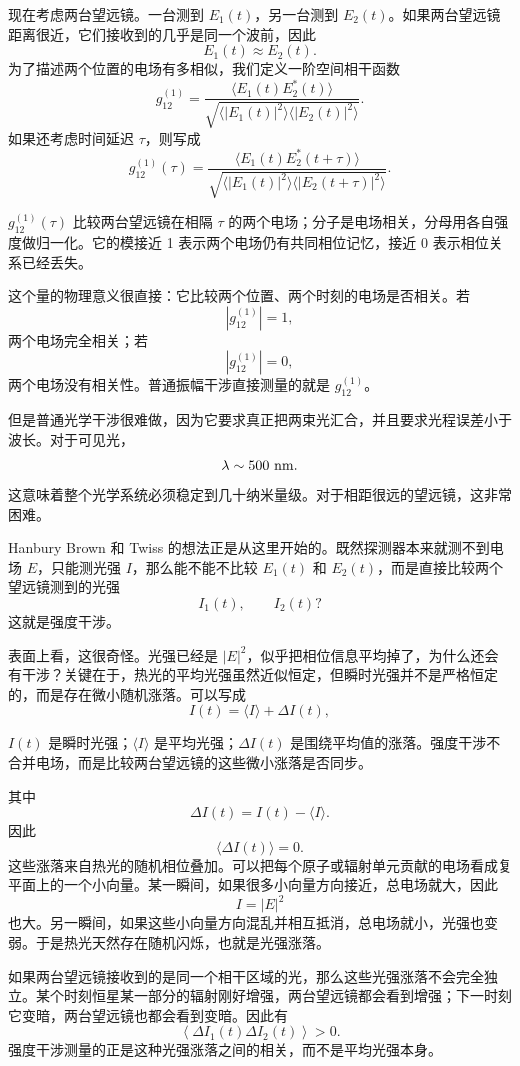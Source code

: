 现在考虑两台望远镜。一台测到 \(E_1(t)\)，另一台测到 \(E_2(t)\)。如果两台望远镜距离很近，它们接收到的几乎是同一个波前，因此
\[
  E_1(t)\approx E_2(t).
\]
为了描述两个位置的电场有多相似，我们定义一阶空间相干函数
\[
  g^{(1)}_{12}
  =
  \frac{
    \langle E_1(t)E_2^\ast(t)\rangle
  }{
    \sqrt{
      \langle |E_1(t)|^2\rangle
      \langle |E_2(t)|^2\rangle
    }
  }.
\]
如果还考虑时间延迟 \(\tau\)，则写成
\[
  g^{(1)}_{12}(\tau)
  =
  \frac{
    \langle E_1(t)E_2^\ast(t+\tau)\rangle
  }{
    \sqrt{
      \langle |E_1(t)|^2\rangle
      \langle |E_2(t+\tau)|^2\rangle
    }
  }.
\]
\begin{formulaexplain}[一阶相干解读]
\(g^{(1)}_{12}(\tau)\) 比较两台望远镜在相隔 \(\tau\) 的两个电场；分子是电场相关，分母用各自强度做归一化。它的模接近 1 表示两个电场仍有共同相位记忆，接近 0 表示相位关系已经丢失。
\end{formulaexplain}
这个量的物理意义很直接：它比较两个位置、两个时刻的电场是否相关。若
\[
  |g^{(1)}_{12}|=1,
\]
两个电场完全相关；若
\[
  |g^{(1)}_{12}|=0,
\]
两个电场没有相关性。普通振幅干涉直接测量的就是 \(g^{(1)}_{12}\)。

但是普通光学干涉很难做，因为它要求真正把两束光汇合，并且要求光程误差小于波长。对于可见光，
\[
  \lambda\sim 500\ {\rm nm}.
\]
这意味着整个光学系统必须稳定到几十纳米量级。对于相距很远的望远镜，这非常困难。

Hanbury Brown 和 Twiss 的想法正是从这里开始的。既然探测器本来就测不到电场 \(E\)，只能测光强 \(I\)，那么能不能不比较 \(E_1(t)\) 和 \(E_2(t)\)，而是直接比较两个望远镜测到的光强
\[
  I_1(t),\qquad I_2(t)?
\]
这就是强度干涉。

表面上看，这很奇怪。光强已经是 \(|E|^2\)，似乎把相位信息平均掉了，为什么还会有干涉？关键在于，热光的平均光强虽然近似恒定，但瞬时光强并不是严格恒定的，而是存在微小随机涨落。可以写成
\[
  I(t)=\langle I\rangle+\Delta I(t),
\]
\begin{formulaexplain}[光强涨落解读]
\(I(t)\) 是瞬时光强；\(\langle I\rangle\) 是平均光强；\(\Delta I(t)\) 是围绕平均值的涨落。强度干涉不合并电场，而是比较两台望远镜的这些微小涨落是否同步。
\end{formulaexplain}
其中
\[
  \Delta I(t)=I(t)-\langle I\rangle.
\]
因此
\[
  \langle \Delta I(t)\rangle=0.
\]
这些涨落来自热光的随机相位叠加。可以把每个原子或辐射单元贡献的电场看成复平面上的一个小向量。某一瞬间，如果很多小向量方向接近，总电场就大，因此
\[
  I=|E|^2
\]
也大。另一瞬间，如果这些小向量方向混乱并相互抵消，总电场就小，光强也变弱。于是热光天然存在随机闪烁，也就是光强涨落。

如果两台望远镜接收到的是同一个相干区域的光，那么这些光强涨落不会完全独立。某个时刻恒星某一部分的辐射刚好增强，两台望远镜都会看到增强；下一时刻它变暗，两台望远镜也都会看到变暗。因此有
\[
  \left\langle \Delta I_1(t)\Delta I_2(t)\right\rangle>0.
\]
强度干涉测量的正是这种光强涨落之间的相关，而不是平均光强本身。

